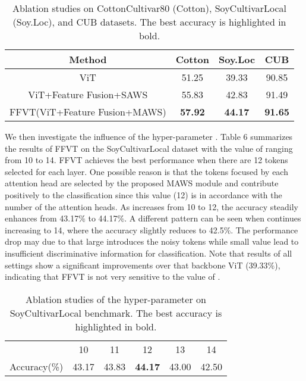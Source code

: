 \documentclass{bmvc2k}
\begin{document}
\begin{table}[!h]
\caption{Ablation studies on CottonCultivar80 (Cotton), SoyCultivarLocal (Soy.Loc), and CUB datasets. The best accuracy is highlighted in bold.}
\centering
\begin{tabular}{c|c|c|c}
\toprule  
Method& Cotton& Soy.Loc& CUB \\
\hline
ViT \cite{dosovitskiy2020image}&51.25&  39.33&  90.85\\
\hline
ViT+Feature Fusion+SAWS &55.83& 42.83&  91.49 \\
\hline
FFVT(ViT+Feature Fusion+MAWS)&\textbf{57.92} & \textbf{44.17} & \textbf{91.65} \\
\bottomrule 
\end{tabular}
\end{table}

We then investigate the influence of the hyper-parameter . Table 6 summarizes the results of FFVT on the SoyCultivarLocal dataset with the value of  ranging from 10 to 14. FFVT achieves the best performance when there are 12 tokens selected for each layer. One possible reason is that the tokens focused by each attention head are selected by the proposed MAWS module and contribute positively to the classification since this value (12) is in accordance with the number of the attention heads. As  increases from 10 to 12, the accuracy steadily enhances from 43.17\% to 44.17\%. A different pattern can be seen when  continues increasing to 14, where the accuracy slightly reduces to 42.5\%. The performance drop may due to that large  introduces the noisy tokens while small  value lead to insufficient discriminative information for classification. Note that results of all  settings show a significant improvements over that backbone ViT (39.33\%), indicating that FFVT is not very sensitive to the value of .

\begin{table}[!h]
\caption{Ablation studies of the hyper-parameter  on SoyCultivarLocal benchmark. The best accuracy is highlighted in bold.}
\centering
\begin{tabular}{cccccc}
\toprule  
 & 10& 11& 12& 13& 14 \\
Accuracy(\%) &43.17&  43.83& \textbf{44.17}& 43.00& 42.50\\

\bottomrule 
\end{tabular}
\end{table}
\end{document}
